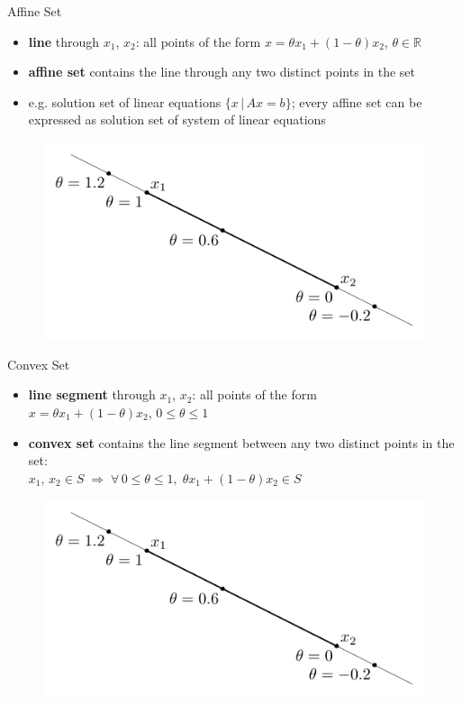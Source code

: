 \documentclass[10pt,handout]{beamer}
\newcommand{\ds}{\displaystyle}
\newcommand{\ie}{\;\Longrightarrow\;}
\theoremstyle{definition}
\begin{document}
\begin{frame}{Affine Set}
  \begin{itemize}
    \item {\bf line} through $x_1$, $x_2$: all points of the form $\ds x = \theta x_1 + (1 - \theta) x_2$, $\theta\in\mathbb{R}$
    \item {\bf affine set} contains the line through any two distinct points in the set
    \item e.g. solution set of linear equations $\ds\{x\,|\,Ax = b\}$; every affine set can be expressed as solution set of system of linear equations
  \end{itemize}
  \begin{figure}[!htbp]
    \centering
    \includegraphics[scale=0.75,page=1]{fig/note06/02.pdf}
  \end{figure}
\end{frame}

\begin{frame}{Convex Set}
  \begin{itemize}
    \item {\bf line segment} through $x_1$, $x_2$: all points of the form \\$\ds x = \theta x_1 + (1 - \theta) x_2$, $0\leqslant\theta\leqslant 1$
    \item {\bf convex set} contains the line segment between any two distinct points in the set: \\$\ds x_1,\,x_2\in S\ie \forall\,0\leqslant\theta\leqslant 1,\;\theta x_1 + (1 - \theta) x_2\in S$
  \end{itemize}
  \begin{figure}[!htbp]
    \centering
    \includegraphics[scale=1,page=2]{fig/note06/02.pdf}
  \end{figure}
\end{frame}
\end{document}
